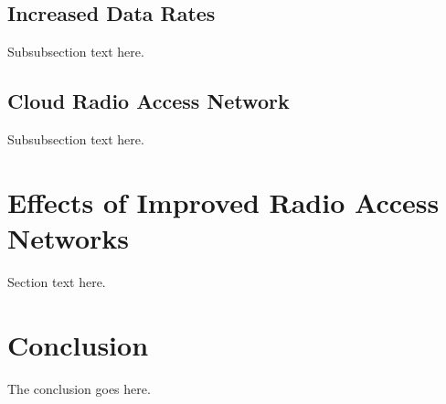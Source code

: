 \documentclass[conference]{IEEEtran}
\begin{document}
\subsection{Increased Data Rates}
Subsubsection text here.

\subsection{Cloud Radio Access Network}
Subsubsection text here.

\section{Effects of Improved Radio Access Networks}
Section text here.

\section{Conclusion}
The conclusion goes here.
\end{document}
